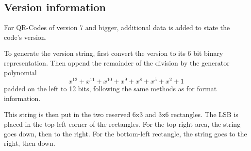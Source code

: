 \subsection{Version information}
\label{ssec:qr_ver_info}

For QR-Codes of version 7 and bigger, additional data is added to state the code's version.

To generate the version string, first convert the version to its 6 bit binary representation. Then append the remainder of the division by the generator polynomial \[
  x^{12} + x^{11} + x^{10} + x^9 + x^8 + x^5 + x^2 + 1
\] padded on the left to 12 bits, following the same methods as for format information.

This string is then put in the two reserved 6x3 and 3x6 rectangles. The LSB is placed in the top-left corner of the rectangles. For the top-right area, the string goes down, then to the right. For the bottom-left rectangle, the string goes to the right, then down.
